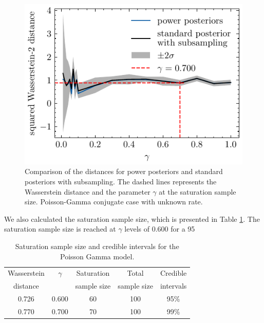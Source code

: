 \documentclass[12pt]{article}
\begin{document}
\begin{figure}
\begin{center}
\includegraphics{imgs/poisson_gamma_99.pdf}
\end{center}
\caption{Comparison of the distances for power posteriors and standard posteriors with subsampling. The dashed lines represents the Wasserstein distance and the parameter $\gamma$ at the saturation sample size. Poisson-Gamma conjugate case with unknown rate.}\label{fig:poisson_gamma_sub}
\end{figure}

We also calculated the saturation sample size, which is presented in Table \cref{tab:satsize}. The saturation sample size is reached at \(\gamma\) levels of 0.600 for a 95%

\begin{table}[h]
	\caption{Saturation sample size and credible intervals for the Poisson Gamma model.}
	\renewcommand{\arraystretch}{1.5}
	\centering
	\begin{tabular}{ccccc} 
		\hline
		Wasserstein & $\gamma$ & Saturation & Total & Credible\\
		distance& &sample size& sample size& intervals\\ [0.5ex] 
		\hline 
		0.726 & 0.600 & 60 & 100 & 95\%\\
		0.770 & 0.700 & 70 & 100 & 99\% \\
		\hline
	\end{tabular}
	\label{tab:satsize}
\end{table}
\end{document}

